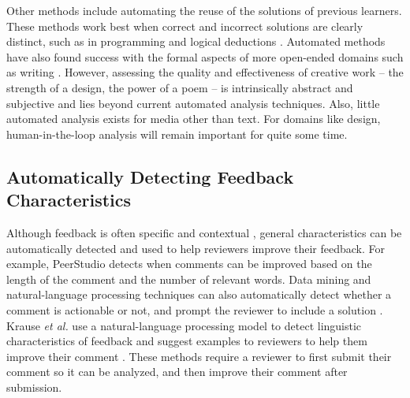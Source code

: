 Other methods include automating the reuse of the solutions of previous learners. These methods work best when correct and incorrect solutions are clearly distinct, such as in programming \cite{Glassman2016, Hartmann2010} and logical deductions \cite{Fast2013}. Automated methods have also found success with the formal aspects of more open-ended domains such as writing \cite{Brooks2014, Roscoe2014}.  However, assessing the quality and effectiveness of creative work – the strength of a design, the power of a poem – is intrinsically abstract and subjective and lies beyond current automated analysis techniques. Also, little automated analysis exists for media other than text. For domains like design, human-in-the-loop analysis will remain important for quite some time. 

\subsection{Automatically Detecting Feedback Characteristics}
Although feedback is often specific and contextual \cite{schon1984reflective}, general characteristics can be automatically detected and used to help reviewers improve their feedback. For example, PeerStudio \cite{Kulkarni2015} detects when comments can be improved based on the length of the comment and the number of relevant words. Data mining and natural-language processing techniques can also automatically detect whether a comment is actionable or not, and prompt the reviewer to include a solution \cite{Nguyen2016, Xiong2012}. Krause \textit{et al.} use a natural-language processing model to detect linguistic characteristics of feedback and suggest examples to reviewers to help them improve their comment \cite{Krause2017}. These methods require a reviewer to first submit their comment so it can be analyzed, and then improve their comment after submission.
